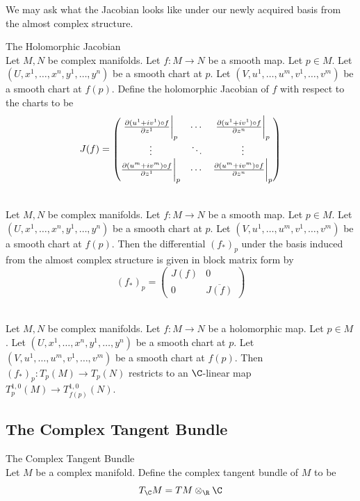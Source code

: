 \documentclass[a4paper]{article}
\begin{document}
We may ask what the Jacobian looks like under our newly acquired basis from the almost complex structure. 

\begin{defn}{The Holomorphic Jacobian}{}\\
Let $M,N$ be complex manifolds. Let $f:M\to N$ be a smooth map. Let $p\in M$. Let $(U,x^1,\dots,x^n,y^1,\dots,y^n)$ be a smooth chart at $p$. Let $(V,u^1,\dots,u^m,v^1,\dots,v^m)$ be a smooth chart at $f(p)$. Define the holomorphic Jacobian of $f$ with respect to the charts to be $$J(f)=\begin{pmatrix}
\frac{\partial(u^1+iv^1)\circ f}{\partial z^1}\bigg{|}_p & \cdots & \frac{\partial(u^1+iv^1)\circ f}{\partial z^n}\bigg{|}_p\\
\vdots & \ddots & \vdots\\
\frac{\partial(u^m+iv^m)\circ f}{\partial z^1}\bigg{|}_p & \cdots & \frac{\partial(u^m+iv^m)\circ f}{\partial z^n}\bigg{|}_p
\end{pmatrix}$$
\end{defn}

\begin{prp}{}{}\\
Let $M,N$ be complex manifolds. Let $f:M\to N$ be a smooth map. Let $p\in M$. Let $(U,x^1,\dots,x^n,y^1,\dots,y^n)$ be a smooth chart at $p$. Let $(V,u^1,\dots,u^m,v^1,\dots,v^m)$ be a smooth chart at $f(p)$. Then the differential $(f_\ast)_p$ under the basis induced from the almost complex structure is given in block matrix form by $$(f_\ast)_p=\begin{pmatrix}
J(f) & 0\\
0 & \overline{J(f)}
\end{pmatrix}$$
\end{prp}

\begin{prp}{}{}\\
Let $M,N$ be complex manifolds. Let $f:M\to N$ be a holomorphic map. Let $p\in M$. Let $(U,x^1,\dots,x^n,y^1,\dots,y^n)$ be a smooth chart at $p$. Let $(V,u^1,\dots,u^m,v^1,\dots,v^m)$ be a smooth chart at $f(p)$. Then $(f_\ast)_p:T_p(M)\to T_p(N)$ restricts to an $\C$-linear map $T_p^{1,0}(M)\to T_{f(p)}^{1,0}(N)$. 
\end{prp}

\subsection{The Complex Tangent Bundle}
\begin{defn}{The Complex Tangent Bundle}{}\\
Let $M$ be a complex manifold. Define the complex tangent bundle of $M$ to be $$T_\C M=TM\otimes_\R\C$$
\end{defn}
\end{document}
